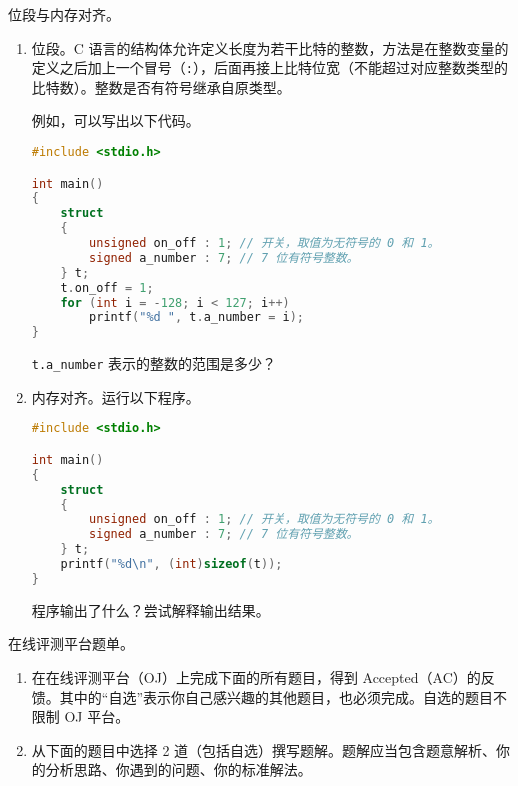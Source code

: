\begin{problemset}
	\item 位段与内存对齐。

	\begin{enumerate}
		\item 位段。C 语言的结构体允许定义长度为若干比特的整数，方法是在整数变量的定义之后加上一个冒号（\lstinline{:}），后面再接上比特位宽（不能超过对应整数类型的比特数）。整数是否有符号继承自原类型。

		例如，可以写出以下代码。

		\begin{lstlisting}[language=c]
#include <stdio.h>

int main()
{
	struct
	{
		unsigned on_off : 1; // 开关，取值为无符号的 0 和 1。
		signed a_number : 7; // 7 位有符号整数。
	} t;
	t.on_off = 1;
	for (int i = -128; i < 127; i++)
		printf("%d ", t.a_number = i);
}
		\end{lstlisting}

		\lstinline{t.a_number} 表示的整数的范围是多少？

		\item 内存对齐。运行以下程序。
		\begin{lstlisting}[language=c]
#include <stdio.h>

int main()
{
	struct
	{
		unsigned on_off : 1; // 开关，取值为无符号的 0 和 1。
		signed a_number : 7; // 7 位有符号整数。
	} t;
	printf("%d\n", (int)sizeof(t));
}
		\end{lstlisting}

		程序输出了什么？尝试解释输出结果。
	\end{enumerate}

	\item 在线评测平台题单。

	\begin{enumerate}
		\item 在在线评测平台（OJ）上完成下面的所有题目，得到 Accepted（AC）的反馈。其中的“自选”表示你自己感兴趣的其他题目，也必须完成。自选的题目不限制 OJ 平台。
		\item 从下面的题目中选择 2 道（包括自选）撰写题解。题解应当包含题意解析、你的分析思路、你遇到的问题、你的标准解法。
	\end{enumerate}


\end{problemset}
